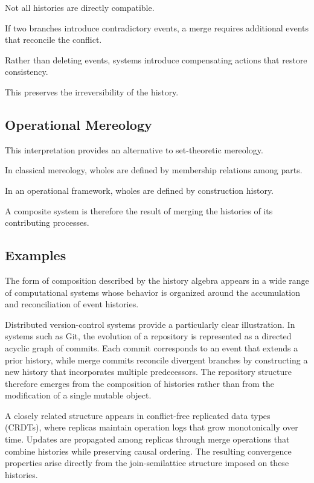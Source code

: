 \documentclass[12pt]{article}
\begin{document}
Not all histories are directly compatible.

If two branches introduce contradictory events,
a merge requires additional events that reconcile
the conflict.

Rather than deleting events, systems introduce
compensating actions that restore consistency.

This preserves the irreversibility of the history.

\subsection{Operational Mereology}

This interpretation provides an alternative to
set-theoretic mereology.

In classical mereology, wholes are defined by
membership relations among parts.

In an operational framework, wholes are defined
by construction history.

A composite system is therefore the result of
merging the histories of its contributing processes.

\subsection{Examples}

The form of composition described by the history algebra
appears in a wide range of computational systems whose
behavior is organized around the accumulation and
reconciliation of event histories.

Distributed version-control systems provide a particularly
clear illustration. In systems such as Git, the evolution
of a repository is represented as a directed acyclic graph
of commits. Each commit corresponds to an event that extends
a prior history, while merge commits reconcile divergent
branches by constructing a new history that incorporates
multiple predecessors. The repository structure therefore
emerges from the composition of histories rather than from
the modification of a single mutable object.

A closely related structure appears in conflict-free
replicated data types (CRDTs), where replicas maintain
operation logs that grow monotonically over time. Updates
are propagated among replicas through merge operations that
combine histories while preserving causal ordering. The
resulting convergence properties arise directly from the
join-semilattice structure imposed on these histories.
\end{document}
